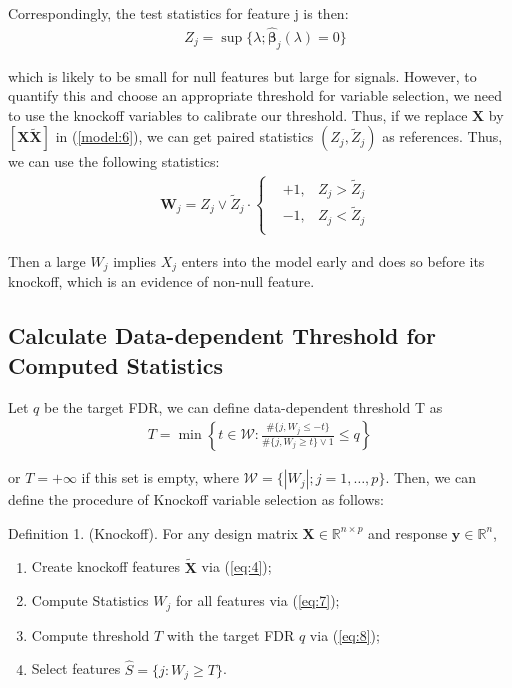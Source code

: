 \documentclass{uwstat572}
\begin{document}
Correspondingly, the test statistics for feature j is then:
\begin{align}
& Z_j = \sup\{\lambda; \hat{\bm{\beta}}_j(\lambda)=0 \}
\end{align}

which is likely to be small for null features but large for signals.
However, to quantify this and choose an appropriate threshold for variable selection, we need to use the knockoff variables to calibrate our threshold. Thus, if we replace $\bm{X}$ by $[\bm{X} \bm{\tilde{X}}]$ in (\ref{model:6}), we can get paired statistics $(Z_j, \tilde{Z}_j)$ as references. Thus, we can use the following statistics:
\begin{align}\label{eq:7}
& \bm{W}_j = Z_j\vee \tilde{Z}_j \cdot \left\{\begin{aligned}
& +1, & 	Z_j > \tilde{Z}_j\\ & -1, & 	Z_j < \tilde{Z}_j\\ 
\end{aligned} \right.
\end{align}

Then a large $W_j$ implies $X_j$ enters into the model early and does so before its knockoff, which is an evidence of non-null feature.

\subsection{Calculate Data-dependent Threshold for Computed Statistics}
Let $q$ be the target FDR, we can define data-dependent threshold T as 
\begin{align}\label{eq:8}
T  = \min\left\{t\in\mathcal{W}: \frac{\#\{j, W_j\leq -t\}}{\#\{j, W_j\geq t\}\vee 1}\leq q \right\}
\end{align}

or $T=+\infty$ if this set is empty, where $\mathcal{W} = \{|W_j|;j=1,\dots,p \}$. Then, we can define the procedure of Knockoff variable selection as follows:

{\sc Definition 1. }(Knockoff). For any design matrix $\bm{X}\in\mathbb{R}^{n\times p}$ and response $\bm{y}\in \mathbb{R}^n$, 
\begin{enumerate}
	\item Create knockoff features $\bm{\tilde X}$ via (\ref{eq:4});
	\item Compute Statistics $W_j$ for all features via (\ref{eq:7});
	\item Compute threshold $T$ with the target FDR $q$ via (\ref{eq:8});
	\item Select features $\hat{S} =\{j: W_j\geq T\}$.
\end{enumerate}
\end{document}
